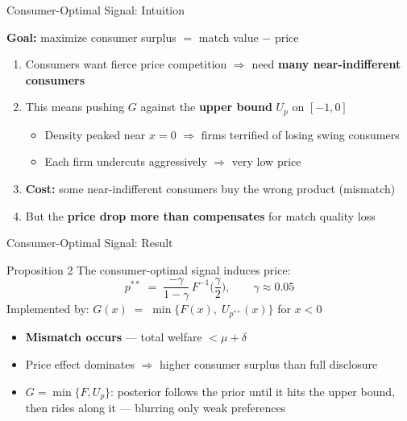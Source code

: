 \documentclass[aspectratio=169, 11pt]{beamer}
\begin{document}
\begin{frame}{Consumer-Optimal Signal: Intuition}

\textbf{Goal:} maximize consumer surplus $= $ match value $-$ price

\bigskip

\begin{enumerate}
    \item Consumers want fierce price competition $\Rightarrow$ need \textbf{many near-indifferent consumers}

    \bigskip

    \item This means pushing $G$ against the \textbf{upper bound} $U_p$ on $[-1,0]$
    \begin{itemize}
        \item Density peaked near $x = 0$ $\Rightarrow$ firms terrified of losing swing consumers
        \item Each firm undercuts aggressively $\Rightarrow$ very low price
    \end{itemize}

    \bigskip

    \item \textbf{Cost:} some near-indifferent consumers buy the wrong product (mismatch)

    \bigskip

    \item But the \textbf{price drop more than compensates} for match quality loss
\end{enumerate}

\end{frame}

\begin{frame}{Consumer-Optimal Signal: Result}

\begin{block}{Proposition 2}
The consumer-optimal signal induces price:
$$p^{**} \;=\; \frac{-\gamma}{1 - \gamma}\, F^{-1}\!\Big(\frac{\gamma}{2}\Big), \qquad \gamma \approx 0.05$$
Implemented by: \; $G(x) \;=\; \min\big\{F(x),\; U_{p^{**}}(x)\big\}$ for $x < 0$
\end{block}

\bigskip

\begin{itemize}
    \item \textbf{Mismatch occurs} --- total welfare $< \mu + \delta$

    \bigskip

    \item Price effect dominates $\Rightarrow$ higher consumer surplus than full disclosure

    \bigskip

    \item $G = \min\{F, U_p\}$: posterior follows the prior until it hits the upper bound, then rides along it --- blurring only weak preferences
\end{itemize}

\end{frame}
\end{document}
